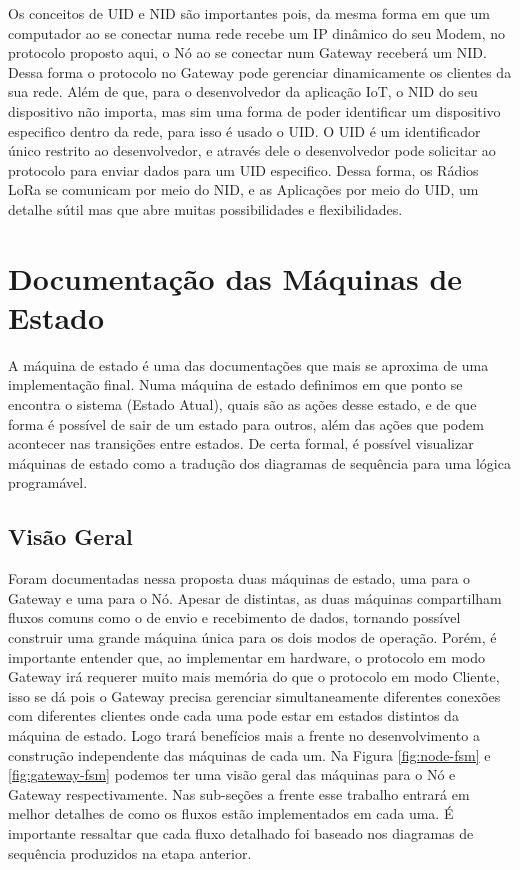 Os conceitos de UID e NID são importantes pois, da mesma forma em que
um computador ao se conectar numa rede recebe um IP dinâmico do seu Modem, 
no protocolo proposto aqui, o Nó ao se conectar num Gateway receberá um
NID. Dessa forma o protocolo no Gateway pode gerenciar dinamicamente os
clientes da sua rede. Além de que, para o desenvolvedor da aplicação IoT,
o NID do seu dispositivo não importa, mas sim uma forma de poder identificar
um dispositivo especifico dentro da rede, para isso é usado o UID. O UID
é um identificador único restrito ao desenvolvedor, e através dele o desenvolvedor
pode solicitar ao protocolo para enviar dados para um UID especifico. Dessa
forma, os Rádios LoRa se comunicam por meio do NID, e as Aplicações por meio
do UID, um detalhe sútil mas que abre muitas possibilidades e flexibilidades.

\section{Documentação das Máquinas de Estado}


A máquina de estado é uma das documentações que mais se aproxima de uma implementação
final. Numa máquina de estado definimos em que ponto se encontra o sistema (Estado
Atual), quais são as ações desse estado, e de que forma é possível de sair
de um estado para outros, além das ações que podem acontecer nas transições entre
estados. De certa formal, é possível visualizar máquinas de estado como
a tradução dos diagramas de sequência para uma lógica programável.

\subsection{Visão Geral}

Foram documentadas nessa proposta duas máquinas de estado, uma para o Gateway
e uma para o Nó. Apesar de distintas, as duas máquinas compartilham fluxos
comuns como o de envio e recebimento de dados, tornando possível construir
uma grande máquina única para os dois modos de operação. Porém, é importante
entender que, ao implementar em hardware, o protocolo em modo Gateway irá
requerer muito mais memória do que o protocolo em modo Cliente, isso se dá
pois o Gateway precisa gerenciar simultaneamente diferentes conexões com diferentes
clientes onde cada uma pode estar em estados distintos da máquina de estado.
Logo trará benefícios mais a frente no desenvolvimento a construção independente 
das máquinas de cada um.
Na Figura \ref{fig:node-fsm} e \ref{fig:gateway-fsm} podemos ter uma visão geral
das máquinas para o Nó e Gateway respectivamente. Nas sub-seções a frente
esse trabalho entrará em melhor detalhes de como os fluxos estão
implementados em cada uma. É importante ressaltar que cada fluxo detalhado foi
baseado nos diagramas de sequência produzidos na etapa anterior.


